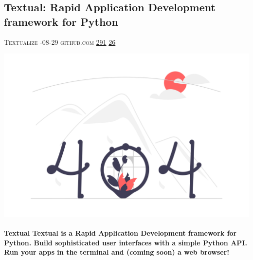 \documentclass[10pt,a4paper]{article}
\begin{document}
\begin{multicols*}{2}

\noindent\begin{minipage}{\linewidth}
\subsection{Textual: Rapid Application Development framework for Python}
\textsc{\footnotesize
{\scriptsize\faUser}\space 
Textualize 
{\scriptsize\faCalendar}-08-29 
{\scriptsize\faGithub}\space 
github.com 
{\scriptsize\faThumbsOUp}\space 
\href{http://news.ycombinator.com/item?id=37174657\&utm\_term=comment}{291} 
{\scriptsize\faComments}\space 
\href{http://news.ycombinator.com/item?id=37174657\&utm\_term=comment}{26} 
}
\par\medskip\noindent
\href{https://github.com/Textualize/textual?utm\_source=hackernewsletter\&utm\_medium=email\&utm\_term=code}{
    \includegraphics[width=0.99\linewidth]{notfound.png}
}
\end{minipage}
\paragraph{}
\textbf{Textual
Textual is a Rapid Application Development framework for Python.
Build sophisticated user interfaces with a simple Python API. Run your apps in the terminal and (coming soon) a web browser!}
\paragraph{}


\end{multicols*}
\end{document}
